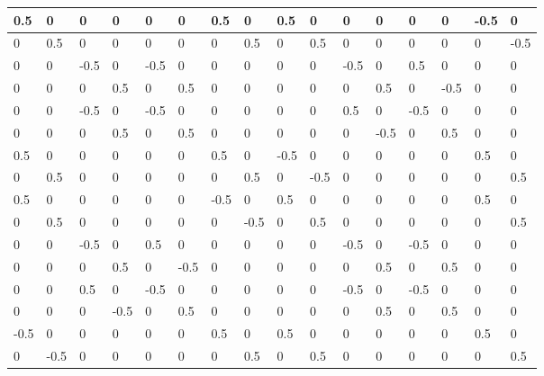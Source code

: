 \begin{tabular}{|l|l|l|l|l|l|l|l|l|l|l|l|l|l|l|l|}
\hline
0.5&0&0&0&0&0&0.5&0&0.5&0&0&0&0&0&-0.5&0\\\hline
0&0.5&0&0&0&0&0&0.5&0&0.5&0&0&0&0&0&-0.5\\\hline
0&0&-0.5&0&-0.5&0&0&0&0&0&-0.5&0&0.5&0&0&0\\\hline
0&0&0&0.5&0&0.5&0&0&0&0&0&0.5&0&-0.5&0&0\\\hline
0&0&-0.5&0&-0.5&0&0&0&0&0&0.5&0&-0.5&0&0&0\\\hline
0&0&0&0.5&0&0.5&0&0&0&0&0&-0.5&0&0.5&0&0\\\hline
0.5&0&0&0&0&0&0.5&0&-0.5&0&0&0&0&0&0.5&0\\\hline
0&0.5&0&0&0&0&0&0.5&0&-0.5&0&0&0&0&0&0.5\\\hline
0.5&0&0&0&0&0&-0.5&0&0.5&0&0&0&0&0&0.5&0\\\hline
0&0.5&0&0&0&0&0&-0.5&0&0.5&0&0&0&0&0&0.5\\\hline
0&0&-0.5&0&0.5&0&0&0&0&0&-0.5&0&-0.5&0&0&0\\\hline
0&0&0&0.5&0&-0.5&0&0&0&0&0&0.5&0&0.5&0&0\\\hline
0&0&0.5&0&-0.5&0&0&0&0&0&-0.5&0&-0.5&0&0&0\\\hline
0&0&0&-0.5&0&0.5&0&0&0&0&0&0.5&0&0.5&0&0\\\hline
-0.5&0&0&0&0&0&0.5&0&0.5&0&0&0&0&0&0.5&0\\\hline
0&-0.5&0&0&0&0&0&0.5&0&0.5&0&0&0&0&0&0.5\\\hline
\end{tabular}
